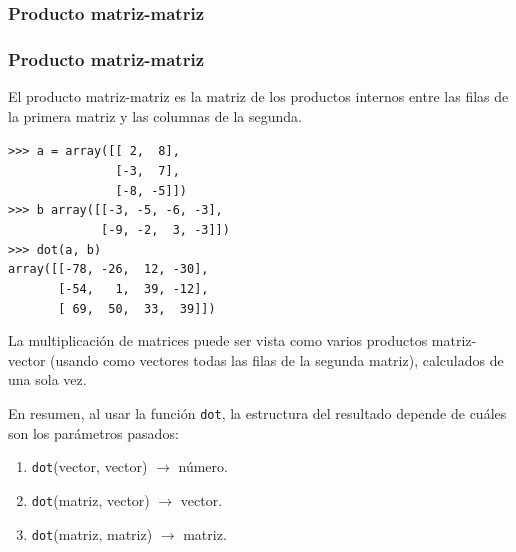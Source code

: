 \subsubsection{Producto matriz-matriz}
\begin{frame}[fragile]
\frametitle{Producto matriz-matriz}
\fontsize{12}{12}\selectfont
El producto matriz-matriz es la matriz de los productos internos entre las filas de la primera matriz y las columnas de la segunda.
\begin{exampleblock}{}
\verb|>>> a = array([[ 2,  8],| \\
\verb|               [-3,  7],| \\
\verb|               [-8, -5]])| \\
\verb|>>> b array([[-3, -5, -6, -3],| \\
\verb|             [-9, -2,  3, -3]])| \\
\pause
\verb|>>> dot(a, b)| \\
\pause
\verb|array([[-78, -26,  12, -30],|\\
\verb|       [-54,   1,  39, -12],| \\
\verb|       [ 69,  50,  33,  39]])| \\
\end{exampleblock}
\end{frame}
\begin{frame}
La multiplicaci\'{o}n de matrices puede ser vista como varios productos matriz-vector (usando como vectores todas las filas de la segunda matriz), calculados de una sola vez.
\end{frame}
\begin{frame}
En resumen, al usar la función \texttt{dot}, la estructura del resultado depende de cu\'{a}les son los par\'{a}metros pasados:
\begin{enumerate}[<+->]
\item \texttt{dot}(vector, vector) $\rightarrow$ n\'{u}mero.
\item \texttt{dot}(matriz, vector) $\rightarrow$ vector.
\item \texttt{dot}(matriz, matriz) $\rightarrow$ matriz.
\end{enumerate}
\end{frame}
